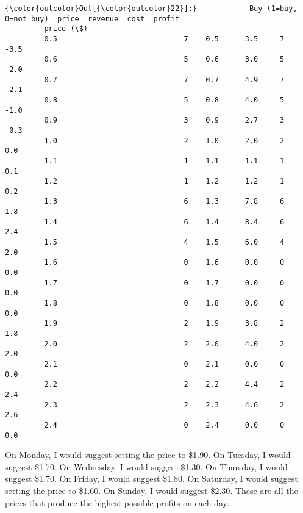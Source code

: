 \documentclass[11pt]{article}
\begin{document}
\begin{Verbatim}[commandchars=\\\{\}]
{\color{outcolor}Out[{\color{outcolor}22}]:}            Buy (1=buy, 0=not buy)  price  revenue  cost  profit
         price (\$)                                                      
         0.5                             7    0.5      3.5     7    -3.5
         0.6                             5    0.6      3.0     5    -2.0
         0.7                             7    0.7      4.9     7    -2.1
         0.8                             5    0.8      4.0     5    -1.0
         0.9                             3    0.9      2.7     3    -0.3
         1.0                             2    1.0      2.0     2     0.0
         1.1                             1    1.1      1.1     1     0.1
         1.2                             1    1.2      1.2     1     0.2
         1.3                             6    1.3      7.8     6     1.8
         1.4                             6    1.4      8.4     6     2.4
         1.5                             4    1.5      6.0     4     2.0
         1.6                             0    1.6      0.0     0     0.0
         1.7                             0    1.7      0.0     0     0.0
         1.8                             0    1.8      0.0     0     0.0
         1.9                             2    1.9      3.8     2     1.8
         2.0                             2    2.0      4.0     2     2.0
         2.1                             0    2.1      0.0     0     0.0
         2.2                             2    2.2      4.4     2     2.4
         2.3                             2    2.3      4.6     2     2.6
         2.4                             0    2.4      0.0     0     0.0
\end{Verbatim}
            
    On Monday, I would suggest setting the price to \$1.90. On Tuesday, I
would suggest \$1.70. On Wednesday, I would suggest \$1.30. On Thursday,
I would suggest \$1.70. On Friday, I would suggest \$1.80. On Saturday,
I would suggest setting the price to \$1.60. On Sunday, I would suggest
\$2.30. These are all the prices that produce the highest possible
profits on each day.


    
    
    
    
\end{document}
